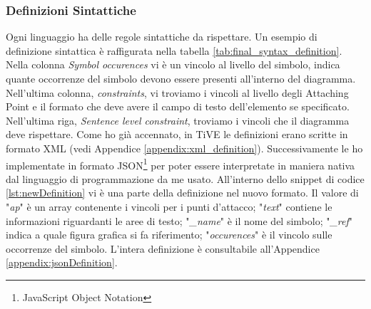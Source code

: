             \subsubsection{Definizioni Sintattiche}
                Ogni linguaggio ha delle regole sintattiche da rispettare. Un esempio di definizione sintattica è raffigurata nella tabella \ref{tab:final_syntax_definition}. Nella colonna \textit{Symbol occurences} vi è un vincolo al livello del simbolo, indica quante occorrenze del simbolo devono essere presenti all'interno del diagramma. Nell'ultima colonna, \textit{constraints}, vi troviamo i vincoli al livello degli Attaching Point e il formato che deve avere il campo di testo dell'elemento se specificato. Nell'ultima riga, \textit{Sentence level constraint}, troviamo i vincoli che il diagramma deve rispettare.
                \newline
                Come ho già accennato, in TiVE le definizioni erano scritte in formato XML (vedi Appendice \ref{appendix:xml_definition}). Successivamente le ho implementate in formato JSON\footnote{JavaScript Object Notation} per poter essere interpretate in maniera nativa dal linguaggio di programmazione da me usato. All'interno dello snippet di codice \ref{lst:newDefinition} vi è una parte della definizione nel nuovo formato. 
                \newline
                Il valore di "\textit{ap}" è un array contenente i vincoli per i punti d'attacco; "\textit{text}" contiene le informazioni riguardanti le aree di testo; "\textit{\_name}" è il nome del simbolo; "\textit{\_ref}" indica a quale figura grafica si fa riferimento; "\textit{occurences}" è il vincolo sulle occorrenze del simbolo.
                \newline
                L'intera definizione è consultabile all'Appendice \ref{appendix:jsonDefinition}.
                \begin{spacing}{0.5}
                    
                \end{spacing}

